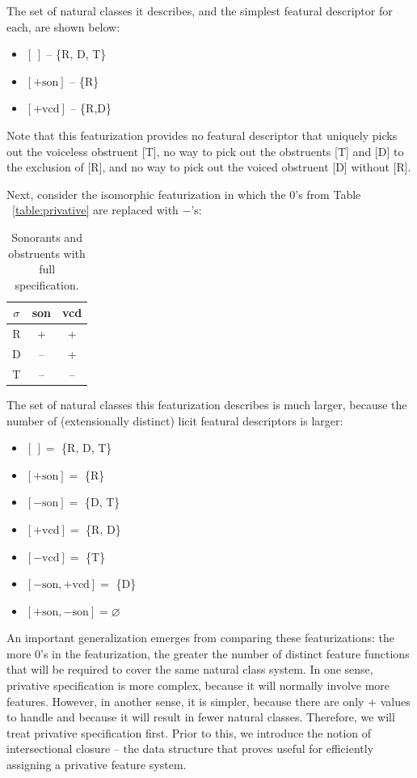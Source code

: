 \documentclass[11pt, oneside]{article}   	%
\begin{document}
\noindent The set of natural classes it describes, and the simplest featural descriptor for each, are shown below: \begin{itemize}
  \item $[\,]$ -- \{R, D, T\}
  \item $[+\text{son}]$ -- \{R\}
  \item $[+\text{vcd}]$ -- \{R,D\}
  \end{itemize}
  
\noindent Note that this featurization provides no featural descriptor that uniquely picks out the voiceless obstruent [T], no way to pick out the obstruents [T] and [D] to the exclusion of [R], and no way to pick out the voiced obstruent [D] without [R].

Next, consider the isomorphic featurization in which the $0$'s from Table ~\ref{table:privative} are replaced with $-$'s:

\begin{table}[h]
    \centering
    \begin{tabular} {|c||c|c|}
    \hline
        $\sigma$ & son & vcd \\ \hline
        R & + & + \\
        D & -- & + \\
        T & -- & -- \\
        \hline
    \end{tabular}
    \caption{Sonorants and obstruents with full specification.}
    \label{table:full}
\end{table}

\noindent The set of natural classes this featurization describes is much larger, because the number of (extensionally distinct) licit featural descriptors is larger: \begin{itemize}
    \item $[\,] =$ \{R, D, T\}
    \item $[+\text{son}] =$ \{R\}
    \item $[-\text{son}] =$ \{D, T\}
    \item $[+\text{vcd}] =$ \{R, D\}
    \item $[-\text{vcd}] =$ \{T\}
    \item $[-\text{son},+\text{vcd}] =$ \{D\}
    \item $[+\text{son},-\text{son}] = \varnothing$
    \end{itemize}

\noindent An important generalization emerges from comparing these featurizations: the more $0$'s in the featurization, the greater the number of distinct feature functions that will be required to cover the same natural class system. In one sense, privative specification is more complex, because it will normally involve more features. However, in another sense, it is simpler, because there are only $+$ values to handle and because it will result in fewer natural classes. Therefore, we will treat privative specification first. Prior to this, we introduce the notion of intersectional closure -- the data structure that proves useful for efficiently assigning a privative feature system.
\end{document}
